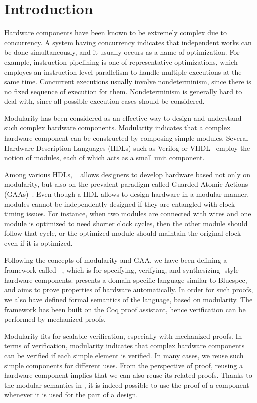 \chapter{Introduction}

Hardware components have been known to be extremely complex due to
concurrency. A system having concurrency indicates that independent
works can be done simultaneously, and it usually occurs as a name of
optimization. For example, instruction pipelining is one of
representative optimizations, which employes an instruction-level
parallelism to handle multiple executions at the same time. Concurrent
executions usually involve nondeterminism, since there is no fixed
sequence of execution for them. Nondeterminism is generally hard to
deal with, since all possible execution cases should be considered.

Modularity has been considered as an effective way to design and
understand such complex hardware components. Modularity indicates that
a complex hardware component can be constructed by composing simple
modules. Several Hardware Description Languages (HDLs) such as Verilog
or VHDL~\cite{verilog, vhdl} employ the notion of modules, each of
which acts as a small unit component.

Among various HDLs, \Bluespec{}~\cite{bsdef, bsref} allows designers
to develop hardware based not only on modularity, but also on the
prevalent paradigm called Guarded Atomic Actions
(GAAs)~\cite{daniel-gaa}. Even though a HDL allows to design hardware
in a modular manner, modules cannot be independently designed if they
are entangled with clock-timing issues. For instance, when two modules
are connected with wires and one module is optimized to need shorter
clock cycles, then the other module should follow that cycle, or the
optimized module should maintain the original clock even if it is
optimized.

Following the concepts of modularity and GAA, we have been defining a
framework called \Kami{}~\cite{kami-web}, which is for specifying,
verifying, and synthesizing \Bluespec{}-style hardware
components. \Kami{} presents a domain specific language similar to
Bluespec, and aims to prove properties of hardware automatically. In
order for such proofs, we also have defined formal semantics of the
\Kami{} language, based on modularity. The framework has been built on
the Coq proof assistant, hence verification can be performed by
mechanized proofs.

Modularity fits for scalable verification, especially with mechanized
proofs. In terms of verification, modularity indicates that complex
hardware components can be verified if each simple element is
verified. In many cases, we reuse such simple components for different
uses. From the perspective of proof, reusing a hardware component
implies that we can also reuse its related proofs. Thanks to the
modular semantics in \Kami{}, it is indeed possible to use the proof
of a component whenever it is used for the part of a design.

